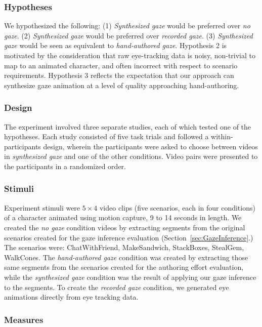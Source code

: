 \subsubsection{Hypotheses}

We hypothesized the following: (1) \emph{Synthesized gaze} would be preferred over \emph{no gaze}. (2) \emph{Synthesized gaze} would be preferred over \emph{recorded gaze}. (3) \emph{Synthesized gaze} would be seen as equivalent to \emph{hand-authored gaze}. Hypothesis 2 is motivated by the consideration that raw eye-tracking data is noisy, non-trivial to map to an animated character, and often incorrect with respect to scenario requirements. Hypothesis 3 reflects the expectation that our approach can synthesize gaze animation at a level of quality approaching hand-authoring.

\subsubsection{Design}

The experiment involved three separate studies, each of which tested one of the hypotheses. Each study consisted of five task trials and followed a within-participants design, wherein the participants were asked to choose between videos in \emph{synthesized gaze} and one of the other conditions. Video pairs were presented to the participants in a randomized order.

\subsubsection{Stimuli}

Experiment stimuli were $5 \times 4$ video clips (five scenarios, each in four conditions) of a character animated using motion capture, 9 to 14 seconds in length. We created the \emph{no gaze} condition videos by extracting segments from the original scenarios created for the gaze inference evaluation (Section~\ref{sec:GazeInference}.) The scenarios were: ChatWithFriend, MakeSandwich, StackBoxes, StealGem, WalkCones. The \emph{hand-authored gaze} condition was created by extracting those same segments from the scenarios created for the authoring effort evaluation, while the \emph{synthesized gaze} condition was the result of applying our gaze inference to the segments. To create the \emph{recorded gaze} condition, we generated eye animations directly from eye tracking data.

\subsubsection{Measures}

